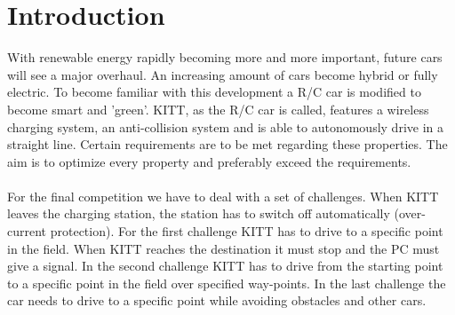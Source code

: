 \documentclass[final]{scrreprt} %
\begin{document}
\chapter{Introduction}
With renewable energy rapidly becoming more and more important, future cars will see a major overhaul. 
An increasing amount of cars become hybrid or fully electric. 
To become familiar with this development a R/C car is modified to become smart and 'green'.
KITT, as the R/C car is called, features a wireless charging system, an anti-collision system and is able to autonomously drive in a straight line. 
Certain requirements are to be met regarding these properties. 
The aim is to optimize every property and preferably exceed the requirements.
\\\\
For the final competition we have to deal with a set of challenges. 
When KITT leaves the charging station, the station has to switch off automatically (over-current protection).
For the first challenge KITT has to drive to a specific point in the field. 
When KITT reaches the destination it must stop and the PC must give a signal. 
In the second challenge KITT has to drive from the starting point to a specific point in the field over specified way-points.
In the last challenge the car needs to drive to a specific point while avoiding obstacles and other cars. 


\end{document}
